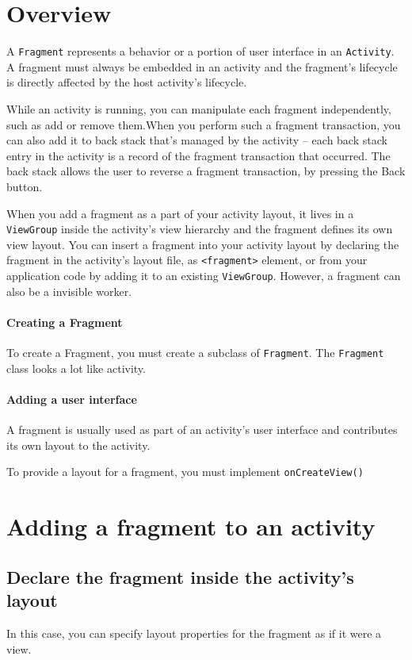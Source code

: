 \documentclass[11pt, a4paper]{book}
\begin{document}
\section{Overview}
A \verb|Fragment| represents a behavior or a portion of user interface in an
\verb|Activity|. A fragment must always be embedded in an activity and the
fragment's lifecycle is directly affected by the host activity's lifecycle.

While an activity is running, you can manipulate each fragment independently,
such as add or remove them.When you perform such a fragment transaction, you can
also add it to back stack that's managed by the activity -- each back stack
entry in the activity is a record of the fragment transaction that occurred. The
back stack allows the user to reverse a fragment transaction, by pressing the
Back button.

When you add a fragment as a part of your activity layout, it lives in a
\verb|ViewGroup| inside the activity's view hierarchy and the fragment defines
its own view layout. You can insert a fragment into your activity layout by
declaring the fragment in the activity's layout file, as \verb|<fragment>|
element, or from your application code by adding it to an existing
\verb|ViewGroup|. However, a fragment can also be a invisible worker.
\paragraph{Creating a Fragment}
To create a Fragment, you must create a subclass of \verb|Fragment|. The
\verb|Fragment| class looks a lot like activity.
\paragraph{Adding a user interface}
A fragment is usually used as part of an activity's user interface and
contributes its own layout to the activity.

To provide a layout for a fragment, you must implement \verb|onCreateView()|
\section{Adding a fragment to an activity}
\subsection{Declare the fragment inside the activity's layout}
In this case, you can specify layout properties for the fragment as if it were a
view.
\end{document}
